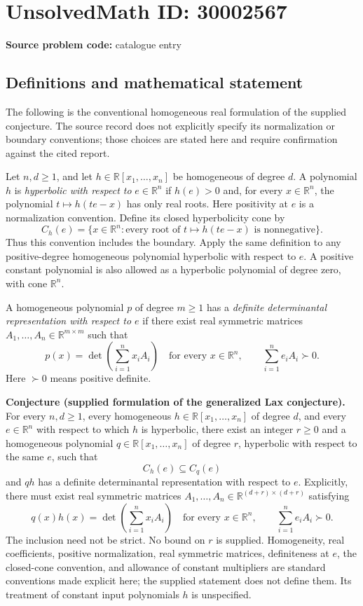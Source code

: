 \documentclass[11pt]{article}
\newcommand{\R}{\mathbb{R}}
\begin{document}
\section*{UnsolvedMath ID: 30002567}
\textbf{Source problem code:} catalogue entry
\subsection{Definitions and mathematical statement}
The following is the conventional homogeneous real formulation of the supplied conjecture. The source record does not explicitly specify its normalization or boundary conventions; those choices are stated here and require confirmation against the cited report.

Let \(n,d\geq 1\), and let \(h\in\R[x_1,\ldots,x_n]\) be homogeneous of degree \(d\). A polynomial \(h\) is \emph{hyperbolic with respect to} \(e\in\R^n\) if \(h(e)>0\) and, for every \(x\in\R^n\), the polynomial \(t\mapsto h(te-x)\) has only real roots. Here positivity at \(e\) is a normalization convention. Define its closed hyperbolicity cone by
\[
 C_h(e)=\bigl\{x\in\R^n:\text{every root of }t\mapsto h(te-x)\text{ is nonnegative}\bigr\}.
\]
Thus this convention includes the boundary. Apply the same definition to any positive-degree homogeneous polynomial hyperbolic with respect to \(e\). A positive constant polynomial is also allowed as a hyperbolic polynomial of degree zero, with cone \(\R^n\).

A homogeneous polynomial \(p\) of degree \(m\geq1\) has a \emph{definite determinantal representation with respect to \(e\)} if there exist real symmetric matrices \(A_1,\ldots,A_n\in\R^{m\times m}\) such that
\[
 p(x)=\det\!\left(\sum_{i=1}^n x_iA_i\right)
 \quad\text{for every }x\in\R^n,
 \qquad
 \sum_{i=1}^n e_iA_i\succ0.
\]
Here \(\succ0\) means positive definite.

\textbf{Conjecture (supplied formulation of the generalized Lax conjecture).} For every \(n,d\geq1\), every homogeneous \(h\in\R[x_1,\ldots,x_n]\) of degree \(d\), and every \(e\in\R^n\) with respect to which \(h\) is hyperbolic, there exist an integer \(r\geq0\) and a homogeneous polynomial \(q\in\R[x_1,\ldots,x_n]\) of degree \(r\), hyperbolic with respect to the same \(e\), such that
\[
 C_h(e)\subseteq C_q(e)
\]
and \(qh\) has a definite determinantal representation with respect to \(e\). Explicitly, there must exist real symmetric matrices \(A_1,\ldots,A_n\in\R^{(d+r)\times(d+r)}\) satisfying
\[
 q(x)h(x)=\det\!\left(\sum_{i=1}^n x_iA_i\right)
 \quad\text{for every }x\in\R^n,
 \qquad
 \sum_{i=1}^n e_iA_i\succ0.
\]
The inclusion need not be strict. No bound on \(r\) is supplied. Homogeneity, real coefficients, positive normalization, real symmetric matrices, definiteness at \(e\), the closed-cone convention, and allowance of constant multipliers are standard conventions made explicit here; the supplied statement does not define them. Its treatment of constant input polynomials \(h\) is unspecified.
\end{document}
